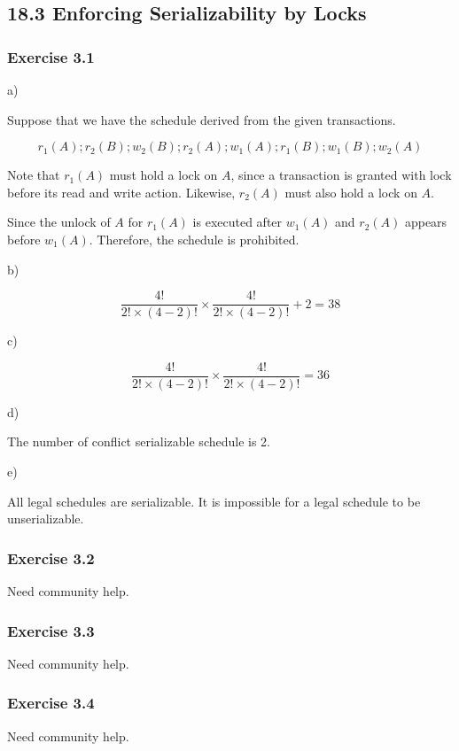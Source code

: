\documentclass[../../main.tex]{subfiles}
\begin{document}
\subsection{18.3 Enforcing Serializability by Locks}

\subsubsection*{Exercise 3.1}

a)

Suppose that we have the schedule derived from the given transactions.

$$
r_{1}(A); r_{2}(B); w_{2}(B); r_{2}(A); w_{1}(A); r_{1}(B); w_{1}(B); w_{2}(A)
$$

Note that $r_{1}(A)$ must hold a lock on $A$, since a transaction is granted with
lock before its read and write action. Likewise, $r_{2}(A)$ must also hold a lock
on $A$.

Since the unlock of $A$ for $r_{1}(A)$ is executed after $w_{1}(A)$ and $r_{2}(A)$
appears before $w_{1}(A)$. Therefore, the schedule is prohibited.

b)

$$
\frac{4!}{2! \times (4 - 2)!} \times \frac{4!}{2! \times (4 - 2)!} + 2 = 38
$$

c)

$$
\frac{4!}{2! \times (4 - 2)!} \times \frac{4!}{2! \times (4 - 2)!} = 36
$$


d)

The number of conflict serializable schedule is 2.

e)

All legal schedules are serializable. It is impossible for a legal schedule
to be unserializable.

\subsubsection*{Exercise 3.2}

Need community help.

\subsubsection*{Exercise 3.3}

Need community help.

\subsubsection*{Exercise 3.4}

Need community help.
\end{document}
